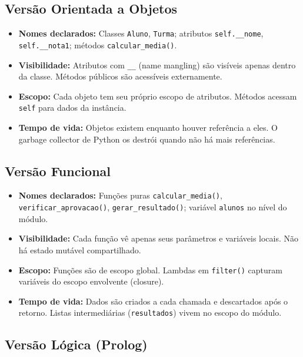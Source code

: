 \documentclass[12pt, a4paper]{article}
\begin{document}
\subsection{Versão Orientada a Objetos}

\begin{itemize}
    \item \textbf{Nomes declarados:} Classes \texttt{Aluno}, \texttt{Turma}; atributos \texttt{self.\_\_nome}, \texttt{self.\_\_nota1}; métodos \texttt{calcular\_media()}.
    \item \textbf{Visibilidade:} Atributos com \texttt{\_\_} (name mangling) são visíveis apenas dentro da classe. Métodos públicos são acessíveis externamente.
    \item \textbf{Escopo:} Cada objeto tem seu próprio escopo de atributos. Métodos acessam \texttt{self} para dados da instância.
    \item \textbf{Tempo de vida:} Objetos existem enquanto houver referência a eles. O garbage collector de Python os destrói quando não há mais referências.
\end{itemize}

\subsection{Versão Funcional}

\begin{itemize}
    \item \textbf{Nomes declarados:} Funções puras \texttt{calcular\_media()}, \texttt{verificar\_aprovacao()}, \texttt{gerar\_resultado()}; variável \texttt{alunos} no nível do módulo.
    \item \textbf{Visibilidade:} Cada função vê apenas seus parâmetros e variáveis locais. Não há estado mutável compartilhado.
    \item \textbf{Escopo:} Funções são de escopo global. Lambdas em \texttt{filter()} capturam variáveis do escopo envolvente (closure).
    \item \textbf{Tempo de vida:} Dados são criados a cada chamada e descartados após o retorno. Listas intermediárias (\texttt{resultados}) vivem no escopo do módulo.
\end{itemize}

\subsection{Versão Lógica (Prolog)}
\end{document}
